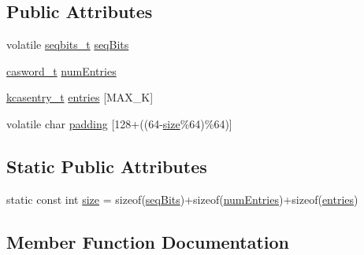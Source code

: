 \subsection*{Public Attributes}
\begin{DoxyCompactItemize}
\item 
volatile \hyperlink{kcas__reuse__htm__impl_8h_a997daf56279be481f5c4294647725689}{seqbits\+\_\+t} \hyperlink{classkcasdesc__t_aed9ffdbc7a72d10a886e662fb82b26df}{seq\+Bits}
\item 
\hyperlink{rq__unsafe_8h_ad45142aaf2ff20a036dc6242b8483e9c}{casword\+\_\+t} \hyperlink{classkcasdesc__t_a841071a61ea7238f822e1fc644111380}{num\+Entries}
\item 
\hyperlink{structkcasentry__t}{kcasentry\+\_\+t} \hyperlink{classkcasdesc__t_adb510f640c081f2550c92f0978d74329}{entries} \mbox{[}M\+A\+X\+\_\+K\mbox{]}
\item 
volatile char \hyperlink{classkcasdesc__t_a09eb9afedfaf7a11192802d2e89e68d1}{padding} \mbox{[}128+((64-\/\hyperlink{classkcasdesc__t_a9cace636d1135fde7fb97772e470dbd4}{size}\%64)\%64)\mbox{]}
\end{DoxyCompactItemize}
\subsection*{Static Public Attributes}
\begin{DoxyCompactItemize}
\item 
static const int \hyperlink{classkcasdesc__t_a9cace636d1135fde7fb97772e470dbd4}{size} = sizeof(\hyperlink{classkcasdesc__t_aed9ffdbc7a72d10a886e662fb82b26df}{seq\+Bits})+sizeof(\hyperlink{classkcasdesc__t_a841071a61ea7238f822e1fc644111380}{num\+Entries})+sizeof(\hyperlink{classkcasdesc__t_adb510f640c081f2550c92f0978d74329}{entries})
\end{DoxyCompactItemize}


\subsection{Member Function Documentation}
\mbox{\label{classkcasdesc__t_a42dbc67de7a757f0d4c8262172994498}} 
